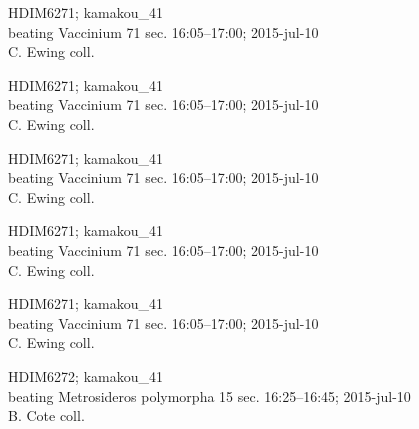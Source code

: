 \documentclass[2pt]{extarticle}
\begin{document}
\noindent
\parbox{0.16\textwidth}{\tiny \raggedright \rule[-0.3\baselineskip]{0pt}{10pt}HDIM6271; kamakou\_41\\ beating Vaccinium 71 sec. 16:05--17:00; 2015-jul-10\\ C. Ewing coll.}
\parbox{0.16\textwidth}{\tiny \raggedright \rule[-0.3\baselineskip]{0pt}{10pt}HDIM6271; kamakou\_41\\ beating Vaccinium 71 sec. 16:05--17:00; 2015-jul-10\\ C. Ewing coll.}
\parbox{0.16\textwidth}{\tiny \raggedright \rule[-0.3\baselineskip]{0pt}{10pt}HDIM6271; kamakou\_41\\ beating Vaccinium 71 sec. 16:05--17:00; 2015-jul-10\\ C. Ewing coll.}
\parbox{0.16\textwidth}{\tiny \raggedright \rule[-0.3\baselineskip]{0pt}{10pt}HDIM6271; kamakou\_41\\ beating Vaccinium 71 sec. 16:05--17:00; 2015-jul-10\\ C. Ewing coll.}
\parbox{0.16\textwidth}{\tiny \raggedright \rule[-0.3\baselineskip]{0pt}{10pt}HDIM6271; kamakou\_41\\ beating Vaccinium 71 sec. 16:05--17:00; 2015-jul-10\\ C. Ewing coll.}
\parbox{0.16\textwidth}{\tiny \raggedright \rule[-0.3\baselineskip]{0pt}{10pt}HDIM6272; kamakou\_41\\ beating Metrosideros polymorpha 15 sec. 16:25--16:45; 2015-jul-10\\ B. Cote coll.} \\ 
\vspace{0.001in} 
\end{document}
